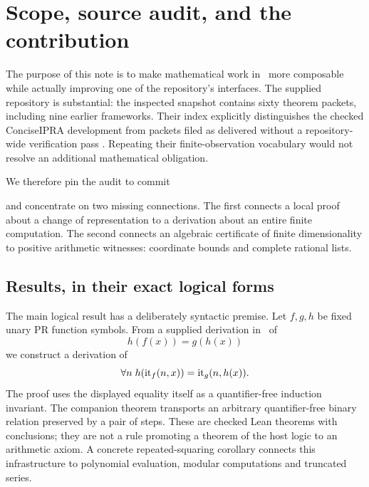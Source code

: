 \section{Scope, source audit, and the contribution}
\label{sec:scope}

The purpose of this note is to make mathematical work in \ipra\ more
composable while actually improving one of the repository's interfaces.
The supplied repository is substantial: the inspected snapshot contains
sixty theorem packets, including nine earlier frameworks. Their index
explicitly distinguishes the checked ConciseIPRA development from packets
filed as delivered without a repository-wide verification pass
\cite{RepoIndex,PacketIndex}. Repeating their finite-observation vocabulary
would not resolve an additional mathematical obligation.

We therefore pin the audit to commit
\begin{center}\small
{}
\end{center}
and concentrate on two missing connections. The first connects a local
proof about a change of representation to a derivation about an entire
finite computation. The second connects an algebraic certificate of
finite dimensionality to positive arithmetic witnesses: coordinate bounds
and complete rational lists.

\subsection{Results, in their exact logical forms}

The main logical result has a deliberately syntactic premise. Let
$f,g,h$ be fixed unary PR function symbols. From a supplied derivation
in \ipra\ of
\[
                      h(f(x))=g(h(x))
\]
we construct a derivation of
\[
       \forall n\;h(\operatorname{it}_f(n,x))=\operatorname{it}_g(n,h(x)).
\]
The proof uses the displayed equality itself as a quantifier-free
induction invariant. The companion theorem transports an arbitrary
quantifier-free binary relation preserved by a pair of steps.
These are checked Lean theorems with  conclusions;
they are not a rule promoting a theorem of the host logic to an
arithmetic axiom. A concrete repeated-squaring corollary connects this
infrastructure to polynomial evaluation, modular computations and
truncated series.

